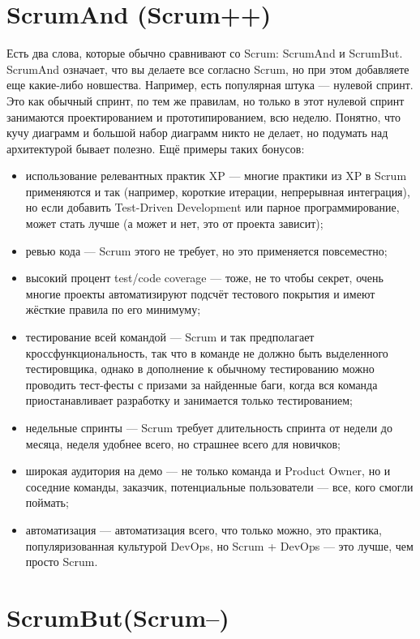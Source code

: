 \documentclass{../../text-style}
\begin{document}
\section{ScrumAnd (Scrum++)}

Есть два слова, которые обычно сравнивают со Scrum: ScrumAnd и ScrumBut. ScrumAnd означает, что вы делаете все согласно Scrum, но при этом добавляете еще какие-либо новшества. Например, есть популярная штука --- нулевой спринт. Это как обычный спринт, по тем же правилам, но только в этот нулевой спринт занимаются проектированием и прототипированием, всю неделю. Понятно, что кучу диаграмм и большой набор диаграмм никто не делает, но подумать над архитектурой бывает полезно. Ещё примеры таких бонусов:

\begin{itemize}
    \item использование релевантных практик XP --- многие практики из XP в Scrum применяются и так (например, короткие итерации, непрерывная интеграция), но если добавить Test-Driven Development или парное программирование, может стать лучше (а может и нет, это от проекта зависит);
    \item ревью кода --- Scrum этого не требует, но это применяется повсеместно;
    \item высокий процент test/code coverage --- тоже, не то чтобы секрет, очень многие проекты автоматизируют подсчёт тестового покрытия и имеют жёсткие правила по его минимуму;
    \item тестирование всей командой --- Scrum и так предполагает кроссфункциональность, так что в команде не должно быть выделенного тестировщика, однако в дополнение к обычному тестированию можно проводить тест-фесты с призами за найденные баги, когда вся команда приостанавливает разработку и занимается только тестированием;
    \item недельные спринты --- Scrum требует длительность спринта от недели до месяца, неделя удобнее всего, но страшнее всего для новичков;
    \item широкая аудитория на демо --- не только команда и Product Owner, но и соседние команды, заказчик, потенциальные пользователи --- все, кого смогли поймать;
    \item автоматизация --- автоматизация всего, что только можно, это практика, популяризованная культурой DevOps, но Scrum + DevOps --- это лучше, чем просто Scrum.
\end{itemize}

\section{ScrumBut(Scrum--)}
\end{document}
